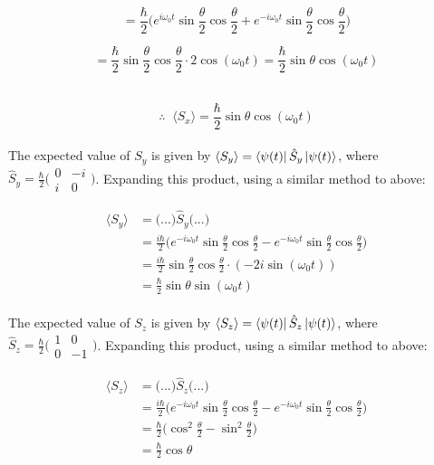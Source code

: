 \documentclass[9pt]{extarticle}
\begin{document}
\begin{multicols*}{2}
$$= \frac \hbar 2 \bigg( e^{i\omega_0 t} \sin \frac \theta 2 \cos \frac\theta 2 + e^{-i\omega_0 t} \sin \frac \theta 2 \cos \frac \theta 2 \bigg)$$ 

$$= \frac \hbar 2 \sin\frac \theta 2 \cos\frac \theta 2 \cdot 2\cos(\omega_0t) = \frac \hbar 2 \sin\theta \cos(\omega_0 t)$$ \ 

$$\therefore \;\; \langle S_x \rangle = \frac \hbar 2 \sin\theta \cos(\omega_0 t)$$ \\ 

The expected value of $S_y$ is given by $\langle S_y \rangle = \bra{\psi(t)} \hat S_y \ket{\psi(t)}$, where $\hat S_y =\frac \hbar 2 \big( \begin{smallmatrix} 0 & -i \\ i & 0 \end{smallmatrix} \big)$. Expanding this product, using a similar method to above:

$$
\begin{aligned}
	\langle S_y \rangle &= \big( ... \big) \hat S_y \big( ... \big) \\ 
	&= \frac{i\hbar}{2} \bigg( e^{-i\omega_0 t} \sin\frac\theta 2 \cos\frac\theta 2 - e^{-i\omega_0t} \sin\frac\theta 2 \cos\frac\theta 2 \bigg) \\ 
	&= \frac{i\hbar}{2} \sin\frac\theta 2 \cos\frac\theta 2 \cdot (-2i\sin(\omega_0t)) \\  
	&= \frac \hbar 2 \sin\theta \sin(\omega_0t)
\end{aligned}
$$ \\ 

The expected value of $S_z$ is given by $\langle S_z\rangle = \bra{\psi(t)} \hat S_z \ket{\psi(t)}$, where $\hat S_z = \frac \hbar 2 \big( \begin{smallmatrix} 1 & 0 \\ 0 & -1 \end{smallmatrix} \big)$. Expanding this product, using a similar method to above:

$$
\begin{aligned}
        \langle S_z \rangle &= \big( ... \big) \hat S_z \big( ... \big) \\ 
        &= \frac{i\hbar}{2} \bigg( e^{-i\omega_0 t} \sin\frac\theta 2 \cos\frac\theta 2 - e^{-i\omega_0t} \sin\frac\theta 2 \cos\frac\theta 2 \bigg) \\ 
        &= \frac \hbar 2 \bigg( \cos^2\frac\theta 2 - \sin^2\frac\theta 2 \bigg) \\ 
        &= \frac \hbar 2 \cos\theta 
\end{aligned}
$$ \\


\end{multicols*}
\end{document}
